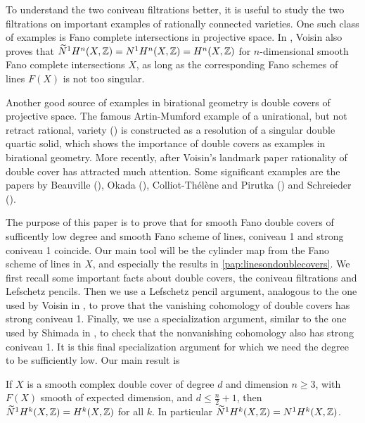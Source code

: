 To understand the two coniveau filtrations better, it is useful to study the two filtrations on important examples of rationally connected varieties. One such class of examples is Fano complete intersections in projective space. In \cite{VoisinConiveauThreefolds}, Voisin also proves that $\widetilde{N}^1H^n(X,\mathbb{Z}) =  N^1H^n(X,\mathbb{Z}) = H^n(X,\mathbb{Z})$ for $n$-dimensional smooth Fano complete intersections $X$, as long as the corresponding Fano schemes of lines $F(X)$ is not too singular.

Another good source of examples in birational geometry is double covers of projective space. The famous Artin-Mumford example of a unirational, but not retract rational, variety (\cite{ArtinMumford}) is constructed as a resolution of a singular double quartic solid, which shows the importance of double covers as examples in birational geometry. More recently, after Voisin's landmark paper \cite{VoisinUniversalCycle} rationality of double cover has attracted much attention. Some significant examples are the papers by Beauville (\cite{BeauvilleSextic}), Okada (\cite[Theorem 1.1]{OkadaCyclicCovers}), Colliot-Thélène and Pirutka (\cite{ColliotThelenePirutkaCyclicCovers}) and Schreieder (\cite[Theorem 9.1]{SchreiederHypersurface}).

The purpose of this paper is to prove that for smooth Fano double covers of sufficently low degree and smooth Fano scheme of lines, coniveau 1 and strong coniveau 1 coincide. Our main tool will be the cylinder map from the Fano scheme of lines in $X$, and especially the results in \cref{pap:linesondoublecovers}. We first recall some important facts about double covers, the coniveau filtrations and Lefschetz pencils. Then we use a Lefschetz pencil argument, analogous to the one used by Voisin in \cite[Theorem 1.13]{VoisinConiveauThreefolds}, to prove that the vanishing cohomology of double covers has strong coniveau 1. Finally, we use a specialization argument, similar to the one used by Shimada in \cite[Theorem 2-ii]{ShimadaHypersurfaces}, to check that the nonvanishing cohomology also has strong coniveau 1. It is this final specialization argument for which we need the degree to be sufficiently low. Our main result is
\begin{theorem}
   \label{thm:IntroductionCoincides}
    If $X$ is a smooth complex double cover of degree $d$ and dimension $n \geq 3$, with $F(X)$ smooth of expected dimension, and $d \leq \frac{n}{2}+1$, then $\widetilde{N}^1H^k(X,\mathbb{Z}) = H^k(X,\mathbb{Z})$ for all $k$. In particular $\widetilde{N}^1H^k(X,\mathbb{Z}) = N^1H^k(X,\mathbb{Z})$.
\end{theorem}

